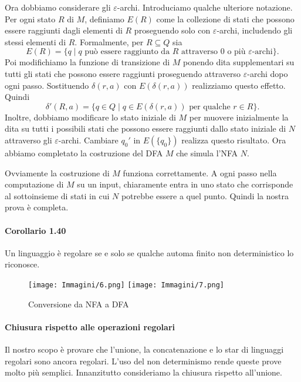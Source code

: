 \documentclass{article}
\begin{document}
    Ora dobbiamo considerare gli $\varepsilon$-archi. Introduciamo qualche ulteriore notazione. Per ogni stato $R$ di $M$, definiamo $E(R)$ come la collezione di stati che possono essere raggiunti dagli elementi di $R$ proseguendo solo con $\varepsilon$-archi, includendo gli stessi elementi di $R$. Formalmente, per $R \subseteq Q$ sia
    \[
        E(R) = \{q \mid q \text{ può essere raggiunto da } R \text{ attraverso 0 o più } \varepsilon\text{-archi}\}.
    \]
    Poi modifichiamo la funzione di transizione di $M$ ponendo dita supplementari su tutti gli stati che possono essere raggiunti proseguendo attraverso $\varepsilon$-archi dopo ogni passo. Sostituendo $\delta(r, a)$ con $E(\delta(r, a))$ realizziamo questo effetto. Quindi
    \[
        \delta'(R, a) = \{q \in Q \mid q \in E(\delta(r, a)) \text{ per qualche } r \in R\}.
    \]
    Inoltre, dobbiamo modificare lo stato iniziale di $M$ per muovere inizialmente la dita su tutti i possibili stati che possono essere raggiunti dallo stato iniziale di $N$ attraverso gli $\varepsilon$-archi. Cambiare $q_0'$ in $E(\{q_0\})$ realizza questo risultato. Ora abbiamo completato la costruzione del DFA $M$ che simula l'NFA $N$.
    
    Ovviamente la costruzione di $M$ funziona correttamente. A ogni passo nella computazione di $M$ su un input, chiaramente entra in uno stato che corrisponde al sottoinsieme di stati in cui $N$ potrebbe essere a quel punto. Quindi la nostra prova è completa.

\paragraph{Corollario 1.40}
\text{  }
\begin{tcolorbox}[colback=purple!10!white, colframe=purple!50!black, title=Corollario 1.40]\label{corollario-1.40}
Un linguaggio è regolare se e solo se qualche automa finito non deterministico lo riconosce.
\end{tcolorbox}

\begin{figure}[H]
    \centering
    \texttt{[image: Immagini/6.png]}
    \texttt{[image: Immagini/7.png]}
    \caption{Conversione da NFA a DFA}
    \label{fig:nfa_example1}
\end{figure}

\paragraph{Chiusura rispetto alle operazioni regolari}
Il nostro scopo è provare che l'unione, la concatenazione e lo star di linguaggi regolari sono ancora regolari. L'uso del non determinismo rende queste prove molto più semplici. Innanzitutto consideriamo la chiusura rispetto all'unione.
\end{document}
